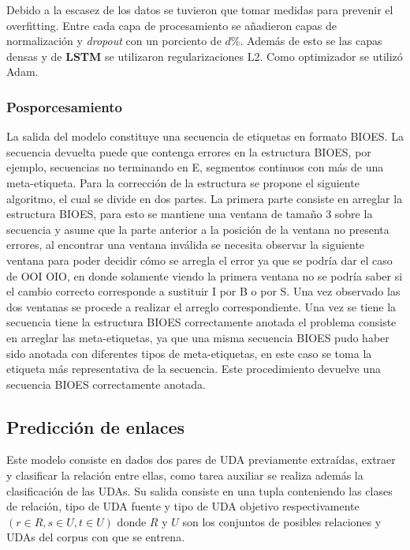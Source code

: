 Debido a la escasez de los datos se tuvieron que tomar medidas para prevenir el overfitting. Entre cada capa de 
procesamiento se añadieron capas de normalización y \emph{dropout} con un porciento de $d$\%. Además de esto se 
las capas densas y de \textbf{LSTM} se utilizaron regularizaciones L2. Como optimizador se utilizó Adam.

\subsubsection{Posporcesamiento}

La salida del modelo constituye una secuencia de etiquetas en formato BIOES. La secuencia devuelta puede que contenga
errores en la estructura BIOES, por ejemplo, secuencias no terminando en E, segmentos continuos con más de una meta-etiqueta.
Para la corrección de la estructura se propone el siguiente algoritmo, el cual se divide en dos partes. La primera
parte consiste en arreglar la estructura BIOES, para esto se mantiene una ventana de tamaño
3 sobre la secuencia y asume que la parte anterior a la posición de la ventana no presenta errores, al encontrar una
ventana inválida se necesita observar la siguiente ventana para poder decidir cómo se arregla el error ya que se
podría dar el caso de OOI OIO, en donde solamente viendo la primera ventana no se podría saber si el cambio 
correcto corresponde a sustituir I por B o por S. Una vez observado las dos ventanas se procede a realizar el 
arreglo correspondiente. Una vez se tiene la secuencia tiene la estructura BIOES correctamente anotada el problema
consiste en arreglar las meta-etiquetas, ya que una misma secuencia BIOES pudo haber sido anotada con diferentes
tipos de meta-etiquetas, en este caso se toma la etiqueta más representativa de la secuencia. Este procedimiento
devuelve una secuencia BIOES correctamente anotada.

\subsection{Predicción de enlaces}

Este modelo consiste en dados dos pares de UDA previamente extraídas, 
extraer y clasificar la relación entre ellas, como tarea auxiliar se realiza además la clasificación 
de las UDAs. Su salida consiste en una tupla conteniendo las clases de relación, tipo de UDA fuente y 
tipo de UDA objetivo respectivamente $(r \in R, s \in U, t \in U)$ donde $R$ y $U$ son los conjuntos de 
posibles relaciones y UDAs del corpus con que se entrena.

